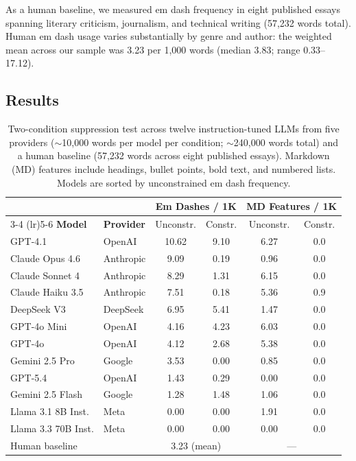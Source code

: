 As a human baseline, we measured em dash frequency in eight published essays spanning literary criticism, journalism, and technical writing (57,232 words total). Human em dash usage varies substantially by genre and author: the weighted mean across our sample was 3.23 per 1,000 words (median 3.83; range 0.33--17.12).

\subsection{Results}

\begin{table}[ht]
\centering
\small
\begin{tabular}{llcccc}
\toprule
& & \multicolumn{2}{c}{\textbf{Em Dashes / 1K}} & \multicolumn{2}{c}{\textbf{MD Features / 1K}} \\
\cmidrule(lr){3-4} \cmidrule(lr){5-6}
\textbf{Model} & \textbf{Provider} & Unconstr. & Constr. & Unconstr. & Constr. \\
\midrule
GPT-4.1             & OpenAI    & 10.62 & 9.10 & 6.27 & 0.0 \\
Claude Opus 4.6     & Anthropic &  9.09 & 0.19 & 0.96 & 0.0 \\
Claude Sonnet 4     & Anthropic &  8.29 & 1.31 & 6.15 & 0.0 \\
Claude Haiku 3.5    & Anthropic &  7.51 & 0.18 & 5.36 & 0.9 \\
DeepSeek V3         & DeepSeek  &  6.95 & 5.41 & 1.47 & 0.0 \\
GPT-4o Mini         & OpenAI    &  4.16 & 4.23 & 6.03 & 0.0 \\
GPT-4o              & OpenAI    &  4.12 & 2.68 & 5.38 & 0.0 \\
Gemini 2.5 Pro      & Google    &  3.53 & 0.00 & 0.85 & 0.0 \\
GPT-5.4             & OpenAI    &  1.43 & 0.29 & 0.00 & 0.0 \\
Gemini 2.5 Flash    & Google    &  1.28 & 1.48 & 1.06 & 0.0 \\
Llama 3.1 8B Inst.  & Meta      &  0.00 & 0.00 & 1.91 & 0.0 \\
Llama 3.3 70B Inst. & Meta      &  0.00 & 0.00 & 0.00 & 0.0 \\
\midrule
Human baseline      &           & \multicolumn{2}{c}{3.23 (mean)} & \multicolumn{2}{c}{---} \\
\bottomrule
\end{tabular}
\caption{Two-condition suppression test across twelve instruction-tuned LLMs from five providers ($\sim$10,000 words per model per condition; $\sim$240,000 words total) and a human baseline (57,232 words across eight published essays). Markdown (MD) features include headings, bullet points, bold text, and numbered lists. Models are sorted by unconstrained em dash frequency.}
\label{tab:suppression}
\end{table}

